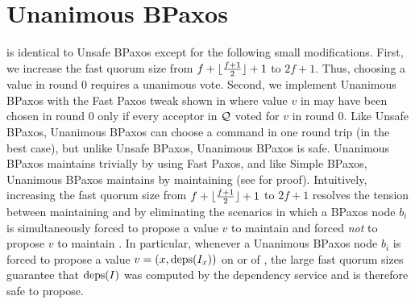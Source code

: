 \section{Unanimous BPaxos}
 is identical to Unsafe BPaxos except for the
following small modifications.  First, we increase the fast quorum size from
$f + \lfloor\frac{f + 1}{2}\rfloor + 1$ to $2f + 1$. Thus, choosing a value in round $0$ requires a
unanimous vote. Second, we implement Unanimous BPaxos with the Fast Paxos
tweak shown in  where value $v$ in
 may have been chosen in round $0$ only if every
acceptor in $\mathcal{Q}$ voted for $v$ in round $0$. Like Unsafe BPaxos, Unanimous
BPaxos can choose a command in one round trip (in the best case), but unlike
Unsafe BPaxos, Unanimous BPaxos is safe.
%
Unanimous BPaxos maintains  trivially by using Fast
Paxos, and like Simple BPaxos, Unanimous BPaxos maintains
 by maintaining  (see
 for proof).
%
Intuitively, increasing the fast quorum size from $f + \lfloor\frac{f + 1}{2}\rfloor + 1$ to $2f +
1$ resolves the tension between maintaining  and
 by eliminating the scenarios in which a BPaxos node
$b_i$ is simultaneously forced to propose a value $v$ to maintain
 and forced \emph{not} to propose $v$ to maintain
. In particular, whenever a Unanimous BPaxos node
$b_i$ is forced to propose a value $v = (x, \text{deps}(I_x))$ on
 or  of
, the large fast quorum sizes guarantee that $\text{deps}(I)$
was computed by the dependency service and is therefore safe to propose.
